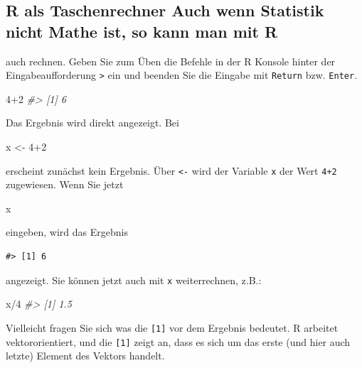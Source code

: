 \documentclass[12pt,]{book}
\newenvironment{Shaded}{\begin{snugshade}}{\end{snugshade}}
\newcommand{\DecValTok}[1]{\textcolor[rgb]{0.00,0.00,0.81}{{#1}}}
\newcommand{\StringTok}[1]{\textcolor[rgb]{0.31,0.60,0.02}{{#1}}}
\newcommand{\CommentTok}[1]{\textcolor[rgb]{0.56,0.35,0.01}{\textit{{#1}}}}
\newcommand{\NormalTok}[1]{{#1}}
\begin{document}
\subsection{R als Taschenrechner Auch wenn Statistik nicht Mathe ist, so
kann man mit
R}\label{r-als-taschenrechner-auch-wenn-statistik-nicht-mathe-ist-so-kann-man-mit-r}

auch rechnen. Geben Sie zum Üben die Befehle in der R Konsole hinter der
Eingabeaufforderung \texttt{\textgreater{}} ein und beenden Sie die
Eingabe mit \texttt{Return} bzw. \texttt{Enter}.

\begin{Shaded}
\begin{Highlighting}[]
\DecValTok{4+2} 
\CommentTok{#> [1] 6}
\end{Highlighting}
\end{Shaded}

Das Ergebnis wird direkt angezeigt. Bei

\begin{Shaded}
\begin{Highlighting}[]
\NormalTok{x <-}\StringTok{ }\DecValTok{4+2} 
\end{Highlighting}
\end{Shaded}

erscheint zunächst kein Ergebnis. Über \texttt{\textless{}-} wird der
Variable \texttt{x} der Wert \texttt{4+2} zugewiesen. Wenn Sie jetzt

\begin{Shaded}
\begin{Highlighting}[]
\NormalTok{x }
\end{Highlighting}
\end{Shaded}

eingeben, wird das Ergebnis

\begin{verbatim}
#> [1] 6
\end{verbatim}

angezeigt. Sie können jetzt auch mit \texttt{x} weiterrechnen, z.B.:

\begin{Shaded}
\begin{Highlighting}[]
\NormalTok{x/}\DecValTok{4} 
\CommentTok{#> [1] 1.5}
\end{Highlighting}
\end{Shaded}

Vielleicht fragen Sie sich was die \texttt{{[}1{]}} vor dem Ergebnis
bedeutet. R arbeitet vektororientiert, und die \texttt{{[}1{]}} zeigt
an, dass es sich um das erste (und hier auch letzte) Element des Vektors
handelt.
\end{document}
